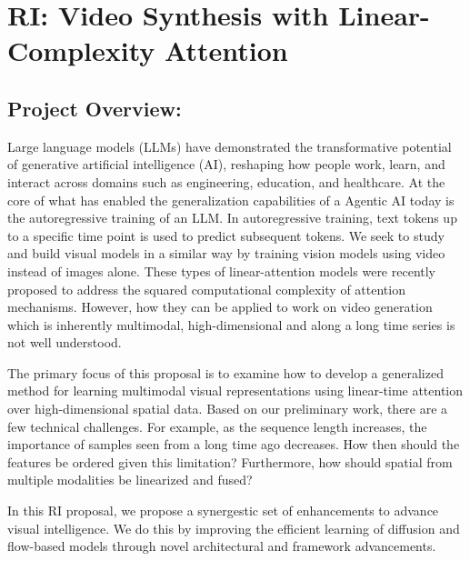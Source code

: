 \section*{RI: Video Synthesis with Linear-Complexity Attention}


\subsection*{Project Overview: }
Large language models (LLMs) have demonstrated the transformative potential of generative artificial intelligence (AI), reshaping how people work, learn, and interact across domains such as engineering, education, and healthcare. At the core of what has enabled the generalization capabilities of a Agentic AI today is the autoregressive training of an LLM. In autoregressive training, text tokens up to a specific time point is used to predict subsequent tokens. We seek to study and build visual models in a similar way by training vision models using video instead of images alone. These types of linear-attention models were recently proposed to address the squared computational complexity of attention mechanisms. However, how they can be applied to work on video generation which is inherently multimodal, high-dimensional and along a long time series is not well understood. 

The primary focus of this proposal is to examine how to develop a generalized method for learning multimodal visual representations using linear-time attention over high-dimensional spatial data. Based on our preliminary work, there are a few technical challenges. For example, as the sequence length increases, the importance of samples seen from a long time ago decreases. How then should the features be ordered given this limitation? Furthermore, how should spatial from multiple modalities be linearized and fused?


In this RI proposal, we propose a synergestic set of enhancements to advance visual intelligence. We do this by improving the efficient learning of diffusion and flow-based models through novel architectural and framework advancements. 

